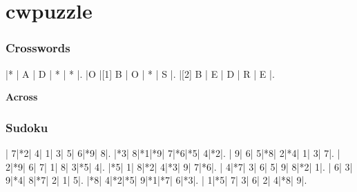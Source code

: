 \documentclass[a4paper]{report}
\begin{document}
\section{cwpuzzle}

\subsubsection{Crosswords}

\begin{Puzzle}{5}{3}
  |* | A | D | * | * |.
  |O |[1] B | O | * | S |.
  |[2] B | E | D | R | E |.
\end{Puzzle}
\begin{PuzzleClues}{\textbf{Across}}%
\end{PuzzleClues}%


\subsubsection{Sudoku}
\begin{Sudoku}
 | 7|*2| 4| 1| 3| 5| 6|*9| 8|.
 |*3| 8|*1|*9| 7|*6|*5| 4|*2|.
 | 9| 6| 5|*8| 2|*4| 1| 3| 7|.
 | 2|*9| 6| 7| 1| 8| 3|*5| 4|.
 |*5| 1| 8|*2| 4|*3| 9| 7|*6|.
 | 4|*7| 3| 6| 5| 9| 8|*2| 1|.
 | 6| 3| 9|*4| 8|*7| 2| 1| 5|.
 |*8| 4|*2|*5| 9|*1|*7| 6|*3|.
 | 1|*5| 7| 3| 6| 2| 4|*8| 9|.
\end{Sudoku}
\end{document}
